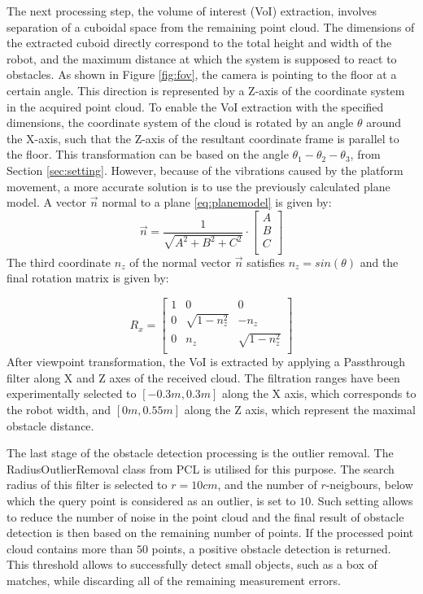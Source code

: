 The next processing step, the volume of interest (VoI) extraction, involves separation of a cuboidal space from the remaining point cloud. The dimensions of the extracted cuboid directly correspond to the total height and width of the robot, and the maximum distance at which the system is supposed to react to obstacles. As shown in Figure \ref{fig:fov}, the camera is pointing to the floor at a certain angle. This direction is represented by a Z-axis of the coordinate system in the acquired point cloud. To enable the VoI extraction with the specified dimensions, the coordinate system of the cloud is rotated by an angle $\theta$ around the X-axis, such that the Z-axis of the resultant coordinate frame is parallel to the floor. This transformation can be based on the angle $\theta_1 - \theta_2 - \theta_3$, from Section \ref{sec:setting}. However, because of the vibrations caused by the platform movement, a more accurate solution is to use the previously calculated plane model. A vector $\vec{n}$ normal to a plane \ref{eq:planemodel} is given by:
\begin{equation}
 \vec{n} = \frac{1}{\sqrt{A^2+B^2+C^2}} \cdot \left[
\begin{array}{c}
A\\
B\\
C\\
\end{array}
\right] 
\end{equation}
The third coordinate $n_z$ of the normal vector $\vec{n}$ satisfies $n_z = sin(\theta)$ and the final rotation matrix is given by:

\begin{equation}
R_x=\left[\begin{array}{ccc}
      1 & 0 & 0  \\
      0 & \sqrt{1 - n_z^2} & -n_z  \\
      0 & n_z & \sqrt{1 - n_z^2}  \\
    \end{array}\right]
\end{equation}
After viewpoint transformation, the VoI is extracted by applying a Passthrough filter along X and Z axes of the received cloud. The filtration ranges have been experimentally selected to $[-0.3m, 0.3m]$ along the X axis, which corresponds to the robot width, and $[0m, 0.55m]$ along the Z axis, which represent the maximal obstacle distance.

The last stage of the obstacle detection processing is the outlier removal. The RadiusOutlierRemoval class from PCL is utilised for this purpose. The search radius of this filter is selected to $r = 10cm$, and the number of $r$-neigbours, below which the query point is considered as an outlier, is set to $10$. Such setting allows to reduce the number of noise in the point cloud and the final result of obstacle detection is then based on the remaining number of points. If the processed point cloud contains more than $50$ points, a positive obstacle detection is returned. This threshold allows to successfully detect small objects, such as a box of matches, while discarding all of the remaining measurement errors.

